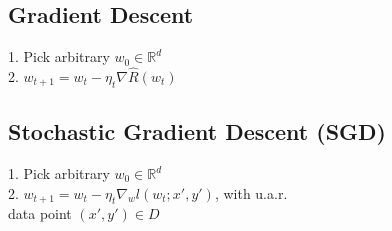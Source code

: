 \subsection*{Gradient Descent}
1. Pick arbitrary $w_0 \in \mathbb{R}^d$\\
2. $w_{t+1} = w_t - \eta_t \nabla \hat{R}(w_t)$

\subsection*{Stochastic Gradient Descent (SGD)}
1. Pick arbitrary $w_0 \in \mathbb{R}^d$\\
2. $w_{t+1} = w_t - \eta_t \nabla_w l(w_t;x',y')$, with u.a.r.\\ data point $(x',y') \in D$
